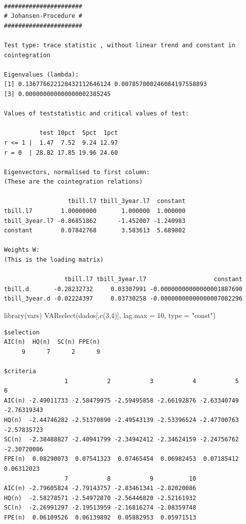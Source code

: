 \documentclass[
  letterpaper,
  DIV=11,
  numbers=noendperiod]{scrartcl}
\newenvironment{Shaded}{\begin{snugshade}}{\end{snugshade}}
\newcommand{\AttributeTok}[1]{\textcolor[rgb]{0.40,0.45,0.13}{#1}}
\newcommand{\DecValTok}[1]{\textcolor[rgb]{0.68,0.00,0.00}{#1}}
\newcommand{\FunctionTok}[1]{\textcolor[rgb]{0.28,0.35,0.67}{#1}}
\newcommand{\NormalTok}[1]{\textcolor[rgb]{0.00,0.23,0.31}{#1}}
\newcommand{\StringTok}[1]{\textcolor[rgb]{0.13,0.47,0.30}{#1}}
\begin{document}
\begin{verbatim}

###################### 
# Johansen-Procedure # 
###################### 

Test type: trace statistic , without linear trend and constant in cointegration 

Eigenvalues (lambda):
[1] 0.136776622128432112646124 0.007857000246084197558893
[3] 0.000000000000000002385245

Values of teststatistic and critical values of test:

          test 10pct  5pct  1pct
r <= 1 |  1.47  7.52  9.24 12.97
r = 0  | 28.82 17.85 19.96 24.60

Eigenvectors, normalised to first column:
(These are the cointegration relations)

                  tbill.l7 tbill_3year.l7  constant
tbill.l7        1.00000000       1.000000  1.000000
tbill_3year.l7 -0.86851862      -1.452007 -1.240983
constant        0.07842768       3.583613  5.689802

Weights W:
(This is the loading matrix)

                 tbill.l7 tbill_3year.l7                   constant
tbill.d       -0.28232732     0.03307991 -0.00000000000000001887690
tbill_3year.d -0.02224397     0.03730258 -0.00000000000000007082296
\end{verbatim}

\begin{Shaded}
\begin{Highlighting}[]
\FunctionTok{library}\NormalTok{(vars)}
\FunctionTok{VARselect}\NormalTok{(dados[,}\FunctionTok{c}\NormalTok{(}\DecValTok{3}\NormalTok{,}\DecValTok{4}\NormalTok{)], }\AttributeTok{lag.max =} \DecValTok{10}\NormalTok{, }\AttributeTok{type =} \StringTok{"const"}\NormalTok{)}
\end{Highlighting}
\end{Shaded}

\begin{verbatim}
$selection
AIC(n)  HQ(n)  SC(n) FPE(n) 
     9      7      2      9 

$criteria
                 1           2           3           4           5           6
AIC(n) -2.49011733 -2.58479975 -2.59495858 -2.66192876 -2.63340749 -2.76319343
HQ(n)  -2.44746282 -2.51370890 -2.49543139 -2.53396524 -2.47700763 -2.57835723
SC(n)  -2.38488827 -2.40941799 -2.34942412 -2.34624159 -2.24756762 -2.30720086
FPE(n)  0.08290073  0.07541323  0.07465454  0.06982453  0.07185412  0.06312023
                 7           8           9          10
AIC(n) -2.79605824 -2.79143757 -2.83461341 -2.82020086
HQ(n)  -2.58278571 -2.54972870 -2.56446820 -2.52161932
SC(n)  -2.26991297 -2.19513959 -2.16816274 -2.08359748
FPE(n)  0.06109526  0.06139892  0.05882953  0.05971513
\end{verbatim}
\end{document}
